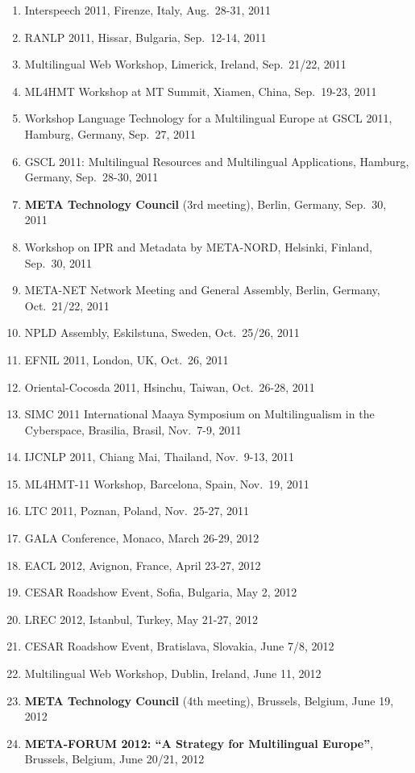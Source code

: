 \documentclass[10pt, plain]{../../metanetpaper}
\begin{document}
\begin{footnotesize}
\begin{enumerate}
\item Interspeech 2011, Firenze, Italy, Aug.~28-31, 2011
\item RANLP 2011, Hissar, Bulgaria, Sep.~12-14, 2011
\item Multilingual Web Workshop, Limerick, Ireland, Sep.~21/22, 2011
\item ML4HMT Workshop at MT Summit, Xiamen, China, Sep.~19-23, 2011
\item Workshop Language Technology for a Multilingual Europe at GSCL 2011, Hamburg, Germany, Sep.~27, 2011
\item GSCL 2011: Multilingual Resources and Multilingual Applications, Hamburg, Germany, Sep.~28-30, 2011
\item \textbf{META Technology Council} (3rd meeting), Berlin, Germany, Sep.~30, 2011
\item Workshop on IPR and Metadata by META-NORD, Helsinki, Finland, Sep.~30, 2011
\item META-NET Network Meeting and General Assembly, Berlin, Germany, Oct.~21/22, 2011
\item NPLD Assembly, Eskilstuna, Sweden, Oct.~25/26, 2011
\item EFNIL 2011, London, UK, Oct.~26, 2011
\item Oriental-Cocosda 2011, Hsinchu, Taiwan, Oct.~26-28, 2011
\item SIMC 2011 International Maaya Symposium on Multilingualism in the Cyberspace, Brasilia, Brasil, Nov.~7-9, 2011
\item IJCNLP 2011, Chiang Mai, Thailand, Nov.~9-13, 2011
\item ML4HMT-11 Workshop, Barcelona, Spain, Nov.~19, 2011
\item LTC 2011, Poznan, Poland, Nov.~25-27, 2011
\item GALA Conference, Monaco, March 26-29, 2012
\item EACL 2012, Avignon, France, April 23-27, 2012
\item CESAR Roadshow Event, Sofia, Bulgaria, May 2, 2012
\item LREC 2012, Istanbul, Turkey, May 21-27, 2012
\item CESAR Roadshow Event, Bratislava, Slovakia, June 7/8, 2012
\item Multilingual Web Workshop, Dublin, Ireland, June 11, 2012
\item \textbf{META Technology Council} (4th meeting), Brussels, Belgium, June 19, 2012
\item \textbf{META-FORUM 2012: ``A Strategy for Multilingual Europe''}, Brussels, Belgium, June 20/21, 2012

\end{enumerate}
\end{footnotesize}
\end{document}
